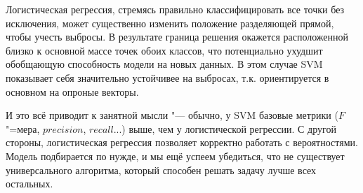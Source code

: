 Логистическая регрессия, стремясь правильно классифицировать все точки без исключения, может существенно изменить положение разделяющей прямой, чтобы учесть выбросы. В результате граница решения окажется расположенной близко к основной массе точек обоих классов, что потенциально ухудшит обобщающую способность модели на новых данных. В этом случае SVM показывает себя значительно устойчивее на выбросах, т.к. ориентируется в основном на опроные векторы.

И это всё приводит к занятной мысли "--- обычно, у SVM базовые метрики ($F$"=мера, $precision$, $recall$...) выше, чем у логистической регрессии. С другой стороны, логистическая регрессия позволяет корректно работать с вероятностями. Модель подбирается по нужде, и мы ещё успеем убедиться, что не существует универсального алгоритма, который способен решать задачу лучше всех остальных.
